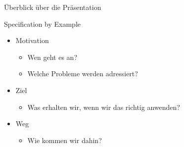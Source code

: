 \begin{frame}{Überblick über die Präsentation}

\Large{Specification by Example}

\vspace{2em}

\begin{itemize}

	\item Motivation
	\begin{itemize}
		\item Wen geht es an?
		\item Welche Probleme werden adressiert?
	\end{itemize}


	\item Ziel
	\begin{itemize}
		\item Was erhalten wir, wenn wir das richtig anwenden?
	\end{itemize}


	\item Weg
	\begin{itemize}
		\item Wie kommen wir dahin?
	\end{itemize}
\end{itemize}

\end{frame}


